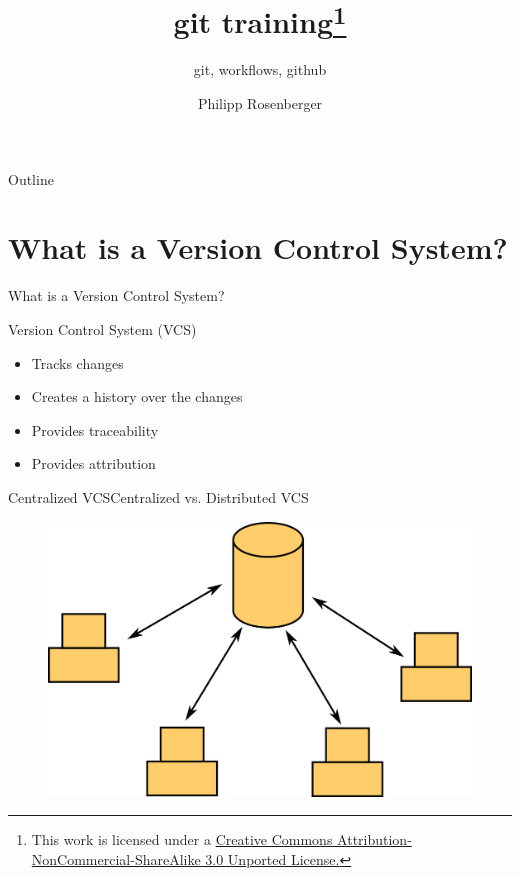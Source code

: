 \documentclass[aspectratio=169]{beamer}
\title {git training\footnote{This work is licensed under a \href{http://creativecommons.org/licenses/by-nc-sa/3.0/}{Creative Commons Attribution-NonCommercial-ShareAlike 3.0 Unported License.}}}
\subtitle{git, workflows, github}
\author{Philipp Rosenberger}
\institute{Ubitium GmbH}
\newcommand{\sectiontitle}{}
\newcommand{\newsection}[1]{\renewcommand{\sectiontitle}{#1}\section{#1}}
\begin{document}
\begin{frame}
\titlepage
\end{frame}

\begin{frame}{Outline}
    \tableofcontents
\end{frame}

\newsection{What is a Version Control System?}
\begin{frame}{\sectiontitle}
\begin{block}{Version Control System (VCS)}
\begin{itemize}
    \item Tracks changes
    \item Creates a history over the changes
    \item Provides traceability
    \item Provides attribution
\end{itemize}
\end{block}
\end{frame}

\begin{frame}{Centralized VCS}{Centralized vs. Distributed VCS}
\begin{figure}
    \centering
    \includegraphics[width=\textwidth,height=0.6\textheight,keepaspectratio]{01_centralized_vcs}
\end{figure}
\end{frame}
\end{document}
